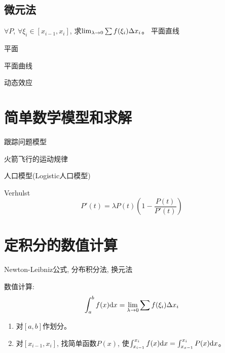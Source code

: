 \subsection{微元法}
$\forall P$, $\forall \xi_i \in [x_{i-1}, x_i]$, 求$\lim_{\lambda \to 0 } \sum f(\xi_i)\Delta x_i$。
平面直线

平面
\begin{example}[静态分布求总量]
    
\end{example}
\begin{solution}
    
\end{solution}

平面曲线

动态效应

\section{简单数学模型和求解}
跟踪问题模型

火箭飞行的运动规律

人口模型(Logistic人口模型)

Verhulst
\begin{equation*}
    P'(t) = \lambda P(t)\left(1-\frac{P(t)}{P'(t)}\right)
\end{equation*}

\section{定积分的数值计算}
Newton-Leibniz公式, 分布积分法, 换元法

数值计算:
\begin{equation*}
    \int_a^b f(x)\mathrm{d} x = \lim_{\lambda \to 0 } \sum f(\xi_i)\Delta x_i
\end{equation*}
\begin{enumerate}
    \item 对$[a, b]$作划分。
    \item 对$[x_{i-1}, x_i]$, 找简单函数$P(x)$, 使$\int_{x_{i-1}}^{x_i} f(x) \mathrm{d} x = \int_{x_{x-1}}^{x_i} P(x) \mathrm{d} x$。
\end{enumerate}

